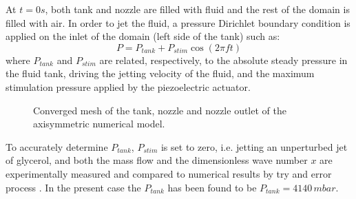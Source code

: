 \documentclass[twocolumn,10pt]{asme2ej}
\begin{document}
At $t=0s$, both tank and nozzle are filled with fluid and the rest of the domain is filled with air. In order to jet the fluid, a pressure Dirichlet boundary condition is applied on the inlet of the domain (left side of the tank) such as:
\begin{equation} \label{eq:plim}
    P=P_{tank}+P_{stim}\cos(2\pi f t)
\end{equation}
where $P_{tank}$ and $P_{stim}$ are related, respectively, to the absolute steady pressure in the fluid tank, driving the jetting velocity of the fluid, and the maximum stimulation pressure applied by the piezoelectric actuator.
\begin{figure}[H]
    \centering    
    \caption{Converged mesh of the tank, nozzle and nozzle outlet of the axisymmetric numerical model.} 
    \label{fig:meshGlycerol}
\end{figure}

To accurately determine $P_{tank}$, $P_{stim}$ is set to zero, i.e. jetting an unperturbed jet of glycerol, and both the mass flow and the dimensionless wave number $x$ are experimentally measured and compared to numerical results by try and error process . In the present case the $P_{tank}$ has been found to be $P_{tank}=4140 \, mbar$. 
\end{document}

